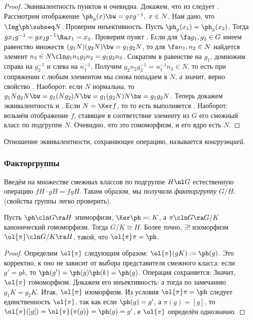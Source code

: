 \documentclass[a4paper]{article}
\begin{document}
\begin{proof}
Эквивалентность пунктов  и  очевидна. Докажем, что из  следует . Рассмотрим
отображение $\ph_g(x) \bw= gxg^{-1}, \; x \in N$. Нам дано, что $\Img \ph \subseq N$. Проверим инъективность.
Пусть $\ph_g(x_1) = \ph_g(x_2)$. Тогда $gx_1g^{-1}=gx_2g^{-1} \Ra x_1=x_2$. Проверим пункт . Если для
$\fa g_1, g_2 \in G$ имеем равенство множеств $(g_1N)(g_2N)\bw=g_1g_2N$, то для $\fa n_1, n_2 \in N$ найдется
элемент $n_3 \in N\cln g_1n_1g_2n_2=g_1g_2n_3$. Сократим в равенстве на $g_1$, домножим справа на $g_2^{-1}$ и
слева на $n_1^{-1}$. Получим $g_2n_2g_2^{-1} = n_1^{-1}n_3 \in N$, то есть при сопряжении с любым элементом
мы снова попадаем в $N$, а значит, верно свойство . Наоборот: если $N$ нормальна, то $g_1Ng_2N \bw= g_1(N
g_2)N \bw= g_1(g_2N)N \bw= g_1g_2N$. Теперь докажем эквивалентность  и . Если $N = \Ker f$, то
то есть выполняется . Наоборот: возьмём отображение $f$, ставящее в соответствие
элементу из $G$ его смежный класс по подгруппе $N$. Очевидно, что это гомоморфизм, и его ядро есть $N$.
\end{proof}

\begin{df}
Отношение эквивалентности, сохраняющее операцию, называется \emph{конгруэнцией}.
\end{df}

\subsubsection{Факторгруппы}

Введём на множестве смежных классов по подгруппе $H \nl G$ естественную операцию $fH \cdot gH = fgH$.  Таким
образом, мы получили \emph{\emph{факторгруппу}} $G/H$. (свойства группы легко проверить).

\begin{theorem}[О гомоморфизме]
Пусть $\ph\cln G \ra H$ эпиморфизм, $\Ker \ph =: K$, а $\pi\cln G \ra G/K$ канонический гомоморфизм.
Тогда $G/K \cong H$. Более точно, $\exists !$ изоморфизм $\ol{\pi}\cln G/K\ra H$, такой, что $\ol{\pi}\pi = \ph$.
\end{theorem}
\begin{proof}
Определим $\ol{\pi}$ следующим образом: $\ol{\pi}(gK) := \ph(g)$. Это корректно, к оно не зависит от
выбора представителя смежного класса: если $g'=gk$, то $\ph(g')=\ph(g)\ph(k)=\ph(g)$. Операция сохраняется:
Значит, $\ol{\pi}$ гомоморфизм. Докажем его инъективность:
а тогда по замечанию $g_1K=g_2K$. Итак, $\ol{\pi}$ изоморфизм. Из условия $\ol{\pi}\pi = \ph$
следует единственность $\ol{\pi}$, так как если $\ph(g) = g'$, а $\pi(g) = [g]$, то
$\ol{\pi}([g])=\ol{\pi}\bigl(\pi(g)\bigr) = \ph(g) = g'$, е $\ol{\pi}$ определён однозначно.
\end{proof}
\end{document}

